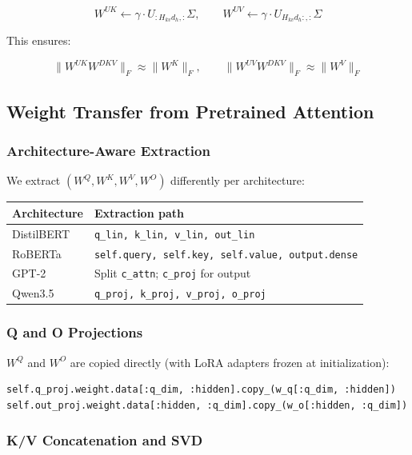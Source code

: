 \[
W^{UK} \leftarrow \gamma \cdot U_{:H_{kv} d_h, :} \Sigma, \qquad
W^{UV} \leftarrow \gamma \cdot U_{H_{kv} d_h:, :} \Sigma
\tag{4.6}
\]

This ensures:

\[
\|W^{UK} W^{DKV}\|_F \approx \|W^K\|_F, \qquad
\|W^{UV} W^{DKV}\|_F \approx \|W^V\|_F
\tag{4.7}
\]

\subsection{Weight Transfer from Pretrained Attention}

\subsubsection{Architecture-Aware Extraction}

We extract $(W^Q, W^K, W^V, W^O)$ differently per architecture:

\begin{table}[H]
\centering
\small
\begin{tabular}{ll}
\toprule
\textbf{Architecture} & \textbf{Extraction path} \\
\midrule
DistilBERT & \texttt{q\_lin, k\_lin, v\_lin, out\_lin} \\
RoBERTa & \texttt{self.query, self.key, self.value, output.dense} \\
GPT-2 & Split \texttt{c\_attn}; \texttt{c\_proj} for output \\
Qwen3.5 & \texttt{q\_proj, k\_proj, v\_proj, o\_proj} \\
\bottomrule
\end{tabular}
\end{table}

\subsubsection{Q and O Projections}

$W^Q$ and $W^O$ are copied directly (with LoRA adapters frozen at 
initialization):

\begin{lstlisting}
self.q_proj.weight.data[:q_dim, :hidden].copy_(w_q[:q_dim, :hidden])
self.out_proj.weight.data[:hidden, :q_dim].copy_(w_o[:hidden, :q_dim])
\end{lstlisting}

\subsubsection{K/V Concatenation and SVD}

